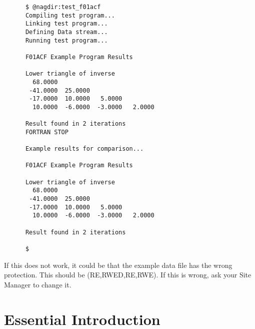 \begin{small}
\begin{verbatim}
      $ @nagdir:test_f01acf                          
      Compiling test program...                      
      Linking test program...                        
      Defining Data stream...                        
      Running test program...                        
                                                     
      F01ACF Example Program Results                 
                                                     
      Lower triangle of inverse                      
        68.0000                                      
       -41.0000  25.0000                             
       -17.0000  10.0000   5.0000                    
        10.0000  -6.0000  -3.0000   2.0000           
                                                     
      Result found in 2 iterations                   
      FORTRAN STOP                                   
                                                     
      Example results for comparison...              
                                                     
      F01ACF Example Program Results                 
                                                     
      Lower triangle of inverse                      
        68.0000                                      
       -41.0000  25.0000                             
       -17.0000  10.0000   5.0000                    
        10.0000  -6.0000  -3.0000   2.0000           
                                                     
      Result found in 2 iterations                   
                                                     
      $                                              
\end{verbatim}
\end{small}

If this does not work, it could be that the example data file has the wrong
protection. This should be (RE,RWED,RE,RWE). If this is wrong, ask your Site
Manager to change it.

\newpage
\section{Essential Introduction}
\label{se:essin}

